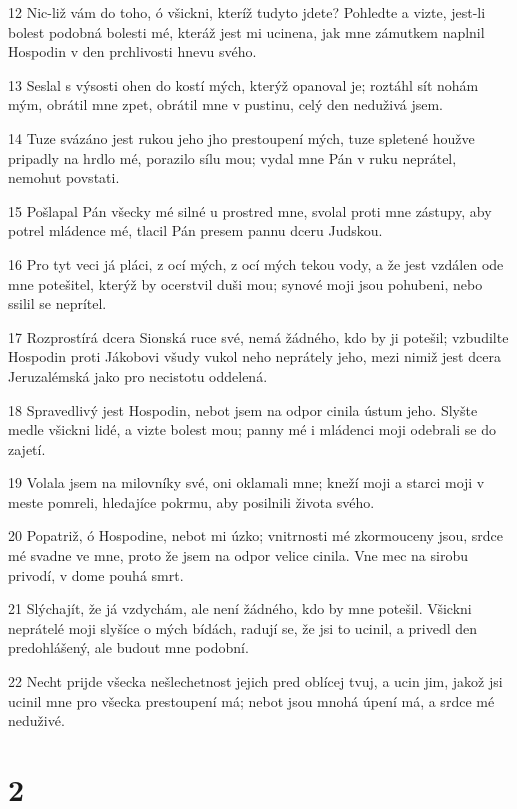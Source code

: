 \par 12 Nic-liž vám do toho, ó všickni, kteríž tudyto jdete? Pohledte a vizte, jest-li bolest podobná bolesti mé, kteráž jest mi ucinena, jak mne zámutkem naplnil Hospodin v den prchlivosti hnevu svého.
\par 13 Seslal s výsosti ohen do kostí mých, kterýž opanoval je; roztáhl sít nohám mým, obrátil mne zpet, obrátil mne v pustinu, celý den neduživá jsem.
\par 14 Tuze svázáno jest rukou jeho jho prestoupení mých, tuze spletené houžve pripadly na hrdlo mé, porazilo sílu mou; vydal mne Pán v ruku neprátel, nemohut povstati.
\par 15 Pošlapal Pán všecky mé silné u prostred mne, svolal proti mne zástupy, aby potrel mládence mé, tlacil Pán presem pannu dceru Judskou.
\par 16 Pro tyt veci já pláci, z ocí mých, z ocí mých tekou vody, a že jest vzdálen ode mne potešitel, kterýž by ocerstvil duši mou; synové moji jsou pohubeni, nebo ssilil se neprítel.
\par 17 Rozprostírá dcera Sionská ruce své, nemá žádného, kdo by ji potešil; vzbudilte Hospodin proti Jákobovi všudy vukol neho neprátely jeho, mezi nimiž jest dcera Jeruzalémská jako pro necistotu oddelená.
\par 18 Spravedlivý jest Hospodin, nebot jsem na odpor cinila ústum jeho. Slyšte medle všickni lidé, a vizte bolest mou; panny mé i mládenci moji odebrali se do zajetí.
\par 19 Volala jsem na milovníky své, oni oklamali mne; kneží moji a starci moji v meste pomreli, hledajíce pokrmu, aby posilnili života svého.
\par 20 Popatriž, ó Hospodine, nebot mi úzko; vnitrnosti mé zkormouceny jsou, srdce mé svadne ve mne, proto že jsem na odpor velice cinila. Vne mec na sirobu privodí, v dome pouhá smrt.
\par 21 Slýchajít, že já vzdychám, ale není žádného, kdo by mne potešil. Všickni neprátelé moji slyšíce o mých bídách, radují se, že jsi to ucinil, a privedl den predohlášený, ale budout mne podobní.
\par 22 Necht prijde všecka nešlechetnost jejich pred oblícej tvuj, a ucin jim, jakož jsi ucinil mne pro všecka prestoupení má; nebot jsou mnohá úpení má, a srdce mé neduživé.

\chapter{2}

